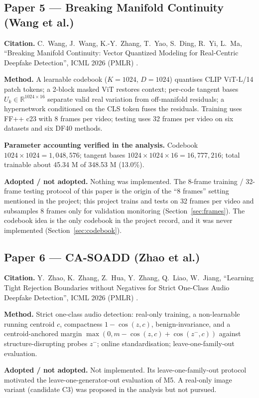\documentclass[10pt,a4paper]{article}
\begin{document}
\subsection{Paper 5 --- Breaking Manifold Continuity (Wang et al.)}
\textbf{Citation.} C.~Wang, J.~Wang, K.-Y.~Zhang, T.~Yao, S.~Ding, R.~Yi, L.~Ma, ``Breaking
Manifold Continuity: Vector Quantized Modeling for Real-Centric Deepfake Detection'', ICML 2026
(PMLR) \cite{wang2026breaking}.

\textbf{Method.} A learnable codebook (\(K=1024\), \(D=1024\)) quantises CLIP ViT-L/14 patch tokens;
a 2-block masked ViT restores context; per-code tangent bases \(U_k\in\mathbb{R}^{1024\times16}\)
separate valid real variation from off-manifold residuals; a hypernetwork conditioned on the CLS
token fuses the residuals. Training uses FF++ c23 with 8 frames per video; testing uses 32 frames
per video on six datasets and six DF40 methods.

\textbf{Parameter accounting verified in the analysis.} Codebook \(1024\times1024=1{,}048{,}576\);
tangent bases \(1024\times1024\times16=16{,}777{,}216\); total trainable about 45.34 M of 348.53 M
(13.0\%).

\textbf{Adopted / not adopted.} Nothing was implemented. The 8-frame training / 32-frame testing
protocol of this paper is the origin of the ``8 frames'' setting mentioned in the project; this
project trains and tests on 32 frames per video and subsamples 8 frames only for validation
monitoring (Section~\ref{sec:frames}). The codebook idea is the only codebook in the project
record, and it was never implemented (Section~\ref{sec:codebook}).

\subsection{Paper 6 --- CA-SOADD (Zhao et al.)}
\textbf{Citation.} Y.~Zhao, K.~Zhang, Z.~Hua, Y.~Zhang, Q.~Liao, W.~Jiang, ``Learning Tight Rejection
Boundaries without Negatives for Strict One-Class Audio Deepfake Detection'', ICML 2026 (PMLR)
\cite{zhao2026casoadd}.

\textbf{Method.} Strict one-class audio detection: real-only training, a non-learnable running
centroid \(c\), compactness \(1-\cos(z,c)\), benign-invariance, and a centroid-anchored margin
\(\max(0,m-\cos(z,c)+\cos(z^-,c))\) against structure-disrupting probes \(z^-\); online
standardisation; leave-one-family-out evaluation.

\textbf{Adopted / not adopted.} Not implemented. Its leave-one-family-out protocol motivated the
leave-one-generator-out evaluation of M5. A real-only image variant (candidate C3) was proposed in
the analysis but not pursued.
\end{document}
